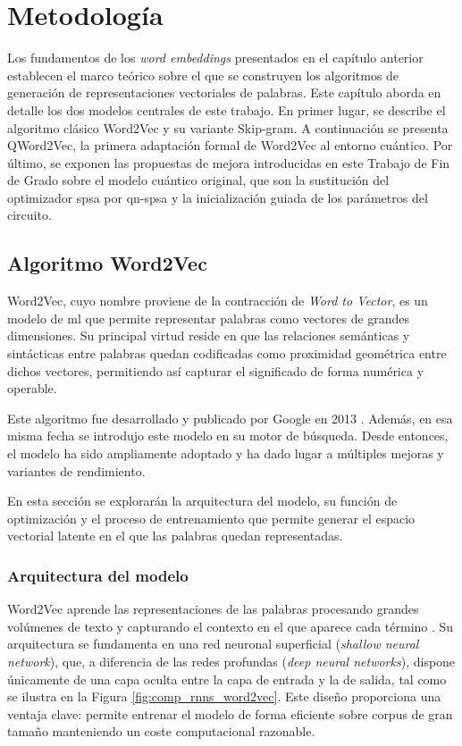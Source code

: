 \chapter{Metodología}
\label{chap:modelos}

Los fundamentos de los \textit{word embeddings} presentados en el capítulo anterior establecen el marco teórico sobre el que se construyen los algoritmos de generación de representaciones vectoriales de palabras. Este capítulo aborda en detalle los dos modelos centrales de este trabajo. En primer lugar, se describe el algoritmo clásico Word2Vec y su variante Skip-gram. A continuación se presenta QWord2Vec, la primera adaptación formal de Word2Vec al entorno cuántico. Por último, se exponen las propuestas de mejora introducidas en este Trabajo de Fin de Grado sobre el modelo cuántico original, que son la sustitución del optimizador \gls{spsa} por \gls{qn-spsa} y la inicialización guiada de los parámetros del circuito.

\section{Algoritmo Word2Vec}
\label{chap:word2vec}

Word2Vec, cuyo nombre proviene de la contracción de \textit{Word to Vector}, es un modelo de \gls{ml} que permite representar palabras como vectores de grandes dimensiones. Su principal virtud reside en que las relaciones semánticas y sintácticas entre palabras quedan codificadas como proximidad geométrica entre dichos vectores, permitiendo así capturar el significado de forma numérica y operable.

Este algoritmo fue desarrollado y publicado por Google en 2013 \cite{google_word2vec_2013}. Además, en esa misma fecha se introdujo este modelo en su motor de búsqueda. Desde entonces, el modelo ha sido ampliamente adoptado y ha dado lugar a múltiples mejoras y variantes de rendimiento.

En esta sección se explorarán la arquitectura del modelo, su función de optimización y el proceso de entrenamiento que permite generar el espacio vectorial latente en el que las palabras quedan representadas.

\subsection{Arquitectura del modelo}

Word2Vec aprende las representaciones de las palabras procesando grandes volúmenes de texto y capturando el contexto en el que aparece cada término \cite{logunova_word2vec_serokell}. Su arquitectura se fundamenta en una red neuronal superficial (\textit{shallow neural network}), que, a diferencia de las redes profundas (\textit{deep neural networks}), dispone únicamente de una capa oculta entre la capa de entrada y la de salida, tal como se ilustra en la Figura \ref{fig:comp_rnns_word2vec}. Este diseño proporciona una ventaja clave: permite entrenar el modelo de forma eficiente sobre corpus de gran tamaño manteniendo un coste computacional razonable.

